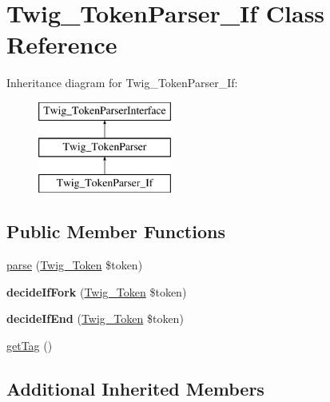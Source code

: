 \hypertarget{classTwig__TokenParser__If}{}\section{Twig\+\_\+\+Token\+Parser\+\_\+\+If Class Reference}
\label{classTwig__TokenParser__If}
Inheritance diagram for Twig\+\_\+\+Token\+Parser\+\_\+\+If\+:\begin{figure}[H]
\begin{center}
\leavevmode
\includegraphics[height=3.000000cm]{classTwig__TokenParser__If}
\end{center}
\end{figure}
\subsection*{Public Member Functions}
\begin{DoxyCompactItemize}
\item 
\hyperlink{classTwig__TokenParser__If_a89c069da14e395e413e77961d0731b95}{parse} (\hyperlink{classTwig__Token}{Twig\+\_\+\+Token} \$token)
\item 
{\bfseries decide\+If\+Fork} (\hyperlink{classTwig__Token}{Twig\+\_\+\+Token} \$token)\hypertarget{classTwig__TokenParser__If_a902aeb1ef2eec3376503216d1a44487c}{}\label{classTwig__TokenParser__If_a902aeb1ef2eec3376503216d1a44487c}

\item 
{\bfseries decide\+If\+End} (\hyperlink{classTwig__Token}{Twig\+\_\+\+Token} \$token)\hypertarget{classTwig__TokenParser__If_a9e12592c31ad7c08d5e43591356d29e9}{}\label{classTwig__TokenParser__If_a9e12592c31ad7c08d5e43591356d29e9}

\item 
\hyperlink{classTwig__TokenParser__If_ae538f3c8dde9ec25e7737b8c37c0f153}{get\+Tag} ()
\end{DoxyCompactItemize}
\subsection*{Additional Inherited Members}


